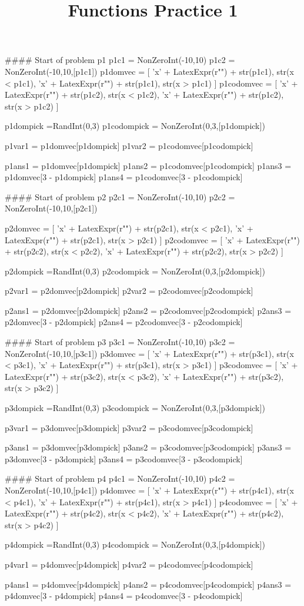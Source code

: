 \documentclass{ximera}
\title{Functions Practice 1}
\begin{document}


\begin{sagesilent}
#### Start of problem p1
p1c1 = NonZeroInt(-10,10)
p1c2 = NonZeroInt(-10,10,[p1c1])
p1domvec = [ 'x' + LatexExpr(r"\leq") + str(p1c1), str(x < p1c1), 'x' + LatexExpr(r"\geq") + str(p1c1), str(x > p1c1) ]
p1codomvec = [ 'x' + LatexExpr(r"\leq") + str(p1c2), str(x < p1c2), 'x' + LatexExpr(r"\geq") + str(p1c2), str(x > p1c2) ]

p1dompick =RandInt(0,3)
p1codompick = NonZeroInt(0,3,[p1dompick])

p1var1 = p1domvec[p1dompick]
p1var2 = p1codomvec[p1codompick]

p1ans1 = p1domvec[p1dompick]
p1ans2 = p1codomvec[p1codompick]
p1ans3 = p1domvec[3 - p1dompick]
p1ans4 = p1codomvec[3 - p1codompick]


#### Start of problem p2
p2c1 = NonZeroInt(-10,10)
p2c2 = NonZeroInt(-10,10,[p2c1])

p2domvec = [ 'x' + LatexExpr(r"\leq") + str(p2c1), str(x < p2c1), 'x' + LatexExpr(r"\geq") + str(p2c1), str(x > p2c1) ]
p2codomvec = [ 'x' + LatexExpr(r"\leq") + str(p2c2), str(x < p2c2), 'x' + LatexExpr(r"\geq") + str(p2c2), str(x > p2c2) ]

p2dompick =RandInt(0,3)
p2codompick = NonZeroInt(0,3,[p2dompick])

p2var1 = p2domvec[p2dompick]
p2var2 = p2codomvec[p2codompick]

p2ans1 = p2domvec[p2dompick]
p2ans2 = p2codomvec[p2codompick]
p2ans3 = p2domvec[3 - p2dompick]
p2ans4 = p2codomvec[3 - p2codompick]


#### Start of problem p3
p3c1 = NonZeroInt(-10,10)
p3c2 = NonZeroInt(-10,10,[p3c1])
p3domvec = [ 'x' + LatexExpr(r"\leq") + str(p3c1), str(x < p3c1), 'x' + LatexExpr(r"\geq") + str(p3c1), str(x > p3c1) ]
p3codomvec = [ 'x' + LatexExpr(r"\leq") + str(p3c2), str(x < p3c2), 'x' + LatexExpr(r"\geq") + str(p3c2), str(x > p3c2) ]

p3dompick =RandInt(0,3)
p3codompick = NonZeroInt(0,3,[p3dompick])

p3var1 = p3domvec[p3dompick]
p3var2 = p3codomvec[p3codompick]

p3ans1 = p3domvec[p3dompick]
p3ans2 = p3codomvec[p3codompick]
p3ans3 = p3domvec[3 - p3dompick]
p3ans4 = p3codomvec[3 - p3codompick]


#### Start of problem p4
p4c1 = NonZeroInt(-10,10)
p4c2 = NonZeroInt(-10,10,[p4c1])
p4domvec = [ 'x' + LatexExpr(r"\leq") + str(p4c1), str(x < p4c1), 'x' + LatexExpr(r"\geq") + str(p4c1), str(x > p4c1) ]
p4codomvec = [ 'x' + LatexExpr(r"\leq") + str(p4c2), str(x < p4c2), 'x' + LatexExpr(r"\geq") + str(p4c2), str(x > p4c2) ]


p4dompick =RandInt(0,3)
p4codompick = NonZeroInt(0,3,[p4dompick])

p4var1 = p4domvec[p4dompick]
p4var2 = p4codomvec[p4codompick]

p4ans1 = p4domvec[p4dompick]
p4ans2 = p4codomvec[p4codompick]
p4ans3 = p4domvec[3 - p4dompick]
p4ans4 = p4codomvec[3 - p4codompick]




\end{sagesilent}
\end{document}
